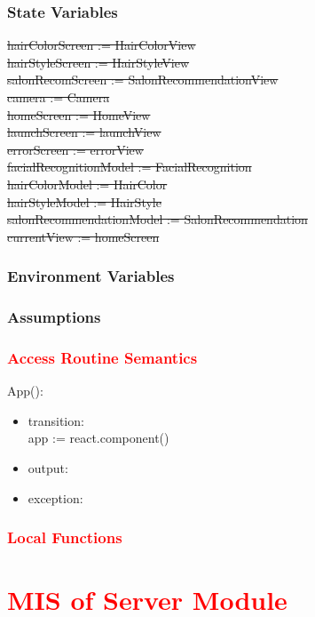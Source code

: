 \documentclass[12pt, titlepage]{article}
\begin{document}
\subsubsection{State Variables}
\sout{hairColorScreen := HairColorView \\
hairStyleScreen := HairStyleView \\
salonRecomScreen := SalonRecommendationView \\
camera := Camera \\
homeScreen := HomeView \\
launchScreen := launchView \\
errorScreen := errorView \\
facialRecognitionModel := FacialRecognition \\
hairColorModel := HairColor \\
hairStyleModel := HairStyle \\
salonRecommendationModel := SalonRecommendation \\
currentView := homeScreen}

\subsubsection{Environment Variables}

\subsubsection{Assumptions}

\subsubsection{\textcolor{red}{Access Routine Semantics}}

\noindent App():
\begin{itemize}
\item transition: \\
app := react.component() 
\item output: 
\item exception:
\end{itemize}

\subsubsection{\textcolor{red}{Local Functions}}


\color{red}
\newpage
\section{\textcolor{red}{MIS of Server Module}}
\end{document}
